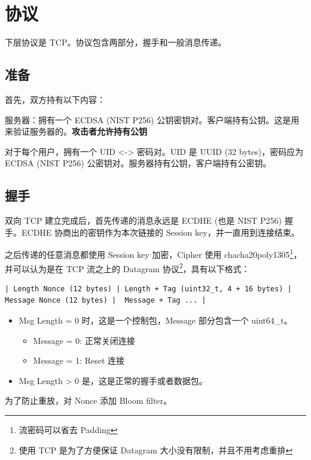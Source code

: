 \documentclass{ctexart}
\begin{document}
  \section{协议}

  下层协议是 TCP。协议包含两部分，握手和一般消息传递。

  \subsection{准备}

  首先，双方持有以下内容：
  
  服务器：拥有一个 ECDSA (NIST P256) 公钥密钥对。客户端持有公钥。这是用来验证服务器的。\textbf{攻击者允许持有公钥}

  对于每个用户，拥有一个 UID <-> 密码对。UID 是 UUID (32 bytes)，密码应为 ECDSA (NIST P256) 公密钥对。服务器持有公钥，客户端持有公密钥。

  \subsection{握手}

  双向 TCP 建立完成后，首先传递的消息永远是 ECDHE (也是 NIST P256) 握手。ECDHE 协商出的密钥作为本次链接的 Session key，并一直用到连接结束。
  
  之后传递的任意消息都使用 Session key 加密，Cipher 使用 chacha20poly1305\footnote{流密码可以省去 Padding}，并可以认为是在 TCP 流之上的 Datagram 协议\footnote{使用 TCP 是为了方便保证 Datagram 大小没有限制，并且不用考虑重排}，具有以下格式：

  \begin{verbatim}
| Length Nonce (12 bytes) | Length + Tag (uint32_t, 4 + 16 bytes) | Message Nonce (12 bytes) |  Message + Tag ... |
  \end{verbatim}

  \begin{itemize}
    \item Msg Length = 0 时，这是一个控制包，Message 部分包含一个 uint64\_t。
    \begin{itemize}
      \item Message = 0: 正常关闭连接
      \item Message = 1: Reset 连接
    \end{itemize}
    \item Msg Length > 0 是，这是正常的握手或者数据包。
  \end{itemize} 

  为了防止重放，对 Nonce 添加 Bloom filter。
\end{document}
